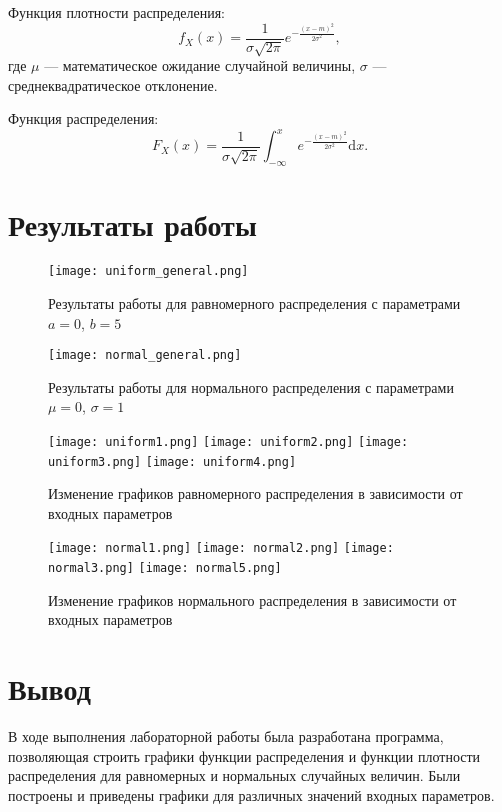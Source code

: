 Функция плотности распределения:
\begin{equation*}
    f_X(x) = \frac{1}{\sigma \sqrt{2 \pi}} e ^ {-\frac{(x - m)^2}{2 \sigma ^ 2}},
\end{equation*}
где $\mu$ --- математическое ожидание случайной величины, $\sigma$ ---
среднеквадратическое отклонение.

Функция распределения:
\begin{equation*}
    F_X(x) = \frac{1}{\sigma \sqrt{2 \pi}} \int_{-\infty}^{x} e ^ {-\frac{(x - m)^2}{2 \sigma ^ 2}} \mathrm{d}x.
\end{equation*}

\pagebreak

\section*{Результаты работы}

\begin{figure}[h]
    \texttt{[image: uniform\_general.png]}
    \caption{Результаты работы для равномерного распределения с параметрами
             $a=0$, $b=5$}
\end{figure}

\begin{figure}[h]
    \texttt{[image: normal\_general.png]}
    \caption{Результаты работы для нормального распределения с параметрами
             $\mu=0$, $\sigma=1$}
\end{figure}

\clearpage

\begin{figure}[h]
    \texttt{[image: uniform1.png]}
    \texttt{[image: uniform2.png]}
    \texttt{[image: uniform3.png]}
    \texttt{[image: uniform4.png]}
    \caption{Изменение графиков равномерного распределения в зависимости от
             входных параметров}
\end{figure}

\begin{figure}[h]
    \texttt{[image: normal1.png]}
    \texttt{[image: normal2.png]}
    \texttt{[image: normal3.png]}
    \texttt{[image: normal5.png]}
    \caption{Изменение графиков нормального распределения в зависимости от
             входных параметров}
\end{figure}

\clearpage

\section*{Вывод}
В ходе выполнения лабораторной работы была разработана программа, позволяющая
строить графики функции распределения и функции плотности распределения
для равномерных и нормальных случайных величин. Были построены и приведены
графики для различных значений входных параметров.

